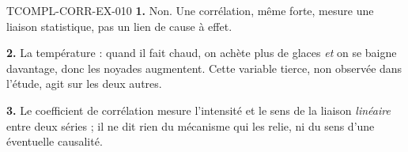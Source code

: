 \begin{corrige}{TCOMPL-CORR-EX-010}
\textbf{1.} Non. Une corrélation, même forte, mesure une liaison statistique,
pas un lien de cause à effet.

\textbf{2.} La température : quand il fait chaud, on achète plus de glaces
\emph{et} on se baigne davantage, donc les noyades augmentent. Cette variable
tierce, non observée dans l'étude, agit sur les deux autres.

\textbf{3.} Le coefficient de corrélation mesure l'intensité et le sens de la
liaison \emph{linéaire} entre deux séries ; il ne dit rien du mécanisme qui
les relie, ni du sens d'une éventuelle causalité.
\end{corrige}
